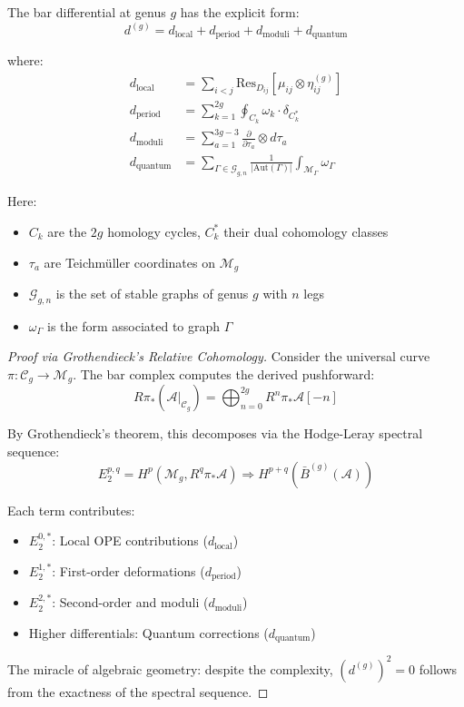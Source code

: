 \begin{theorem}\label{thm:higher-genus-diff}
The bar differential at genus $g$ has the explicit form:
$$d^{(g)} = d_{\text{local}} + d_{\text{period}} + d_{\text{moduli}} + d_{\text{quantum}}$$

where:
\begin{align}
d_{\text{local}} &= \sum_{i<j} \text{Res}_{D_{ij}} \left[\mu_{ij} \otimes \eta_{ij}^{(g)}\right] \\
d_{\text{period}} &= \sum_{k=1}^{2g} \oint_{C_k} \omega_k \cdot \delta_{C_k^*} \\
d_{\text{moduli}} &= \sum_{a=1}^{3g-3} \frac{\partial}{\partial \tau_a} \otimes d\tau_a \\
d_{\text{quantum}} &= \sum_{\Gamma \in \mathcal{G}_{g,n}} \frac{1}{|\text{Aut}(\Gamma)|} \int_{\mathcal{M}_\Gamma} \omega_\Gamma
\end{align}

Here:
\begin{itemize}
\item $C_k$ are the $2g$ homology cycles, $C_k^*$ their dual cohomology classes
\item $\tau_a$ are Teichmüller coordinates on $\mathcal{M}_g$
\item $\mathcal{G}_{g,n}$ is the set of stable graphs of genus $g$ with $n$ legs
\item $\omega_\Gamma$ is the form associated to graph $\Gamma$
\end{itemize}
\end{theorem}

\begin{proof}[Proof via Grothendieck's Relative Cohomology]
Consider the universal curve $\pi: \mathcal{C}_g \to \mathcal{M}_g$. The bar complex computes the derived pushforward:
$$R\pi_* \left(\mathcal{A}|_{\mathcal{C}_g}\right) = \bigoplus_{n=0}^{2g} R^n\pi_* \mathcal{A}[-n]$$

By Grothendieck's theorem, this decomposes via the Hodge-Leray spectral sequence:
$$E_2^{p,q} = H^p(\mathcal{M}_g, R^q\pi_*\mathcal{A}) \Rightarrow H^{p+q}(\bar{B}^{(g)}(\mathcal{A}))$$

Each term contributes:
\begin{itemize}
\item $E_2^{0,*}$: Local OPE contributions ($d_{\text{local}}$)
\item $E_2^{1,*}$: First-order deformations ($d_{\text{period}}$)
\item $E_2^{2,*}$: Second-order and moduli ($d_{\text{moduli}}$)
\item Higher differentials: Quantum corrections ($d_{\text{quantum}}$)
\end{itemize}

The miracle of algebraic geometry: despite the complexity, $(d^{(g)})^2 = 0$ follows from the exactness of the spectral sequence.
\end{proof}

